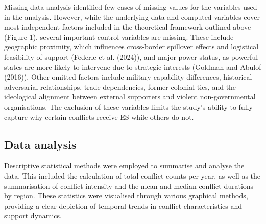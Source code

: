 \documentclass[
]{article}
\begin{document}
Missing data analysis identified few cases of missing values for the
variables used in the analysis. However, while the underlying data and
computed variables cover most independent factors included in the
theoretical framework outlined above (Figure 1), several important
control variables are missing. These include geographic proximity, which
influences cross-border spillover effects and logistical feasibility of
support (Federle et al. (2024)), and major power status, as powerful
states are more likely to intervene due to strategic interests (Goldman
and Abulof (2016)). Other omitted factors include military capability
differences, historical adversarial relationships, trade dependencies,
former colonial ties, and the ideological alignment between external
supporters and violent non-governmental organisations. The exclusion of
these variables limits the study's ability to fully capture why certain
conflicts receive ES while others do not.

\subsection{Data analysis}\label{data-analysis}

Descriptive statistical methods were employed to summarise and analyse
the data. This included the calculation of total conflict counts per
year, as well as the summarisation of conflict intensity and the mean
and median conflict durations by region. These statistics were
visualised through various graphical methods, providing a clear
depiction of temporal trends in conflict characteristics and support
dynamics.
\end{document}

